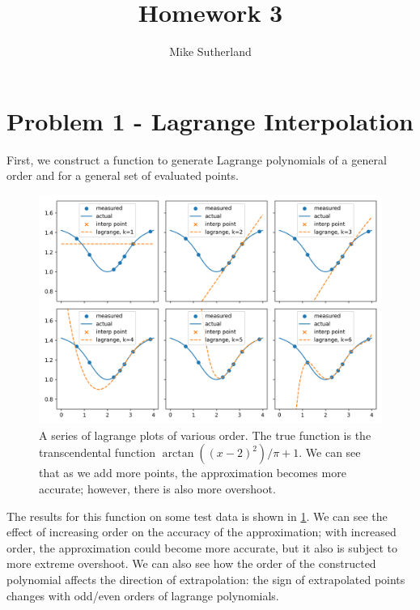 \documentclass[10pt,letterpaper]{article}
\author{Mike Sutherland}y
\title{Homework 3}
\begin{document}
    \maketitle
    
    \section{Problem 1 - Lagrange Interpolation}
    First, we construct a function to generate Lagrange polynomials of a general order and for a general set of evaluated points.
    \begin{figure}[h]
        \centering
        \includegraphics[width=1.0\linewidth]{../plots/lagrange.png}
        \caption{A series of lagrange plots of various order. The true function is the transcendental function $\arctan((x-2)^2)/\pi + 1$. We can see that as we add more points, the approximation becomes more accurate; however, there is also more overshoot.}
        \label{fig:lagrange}
    \end{figure}
    The results for this function on some test data is shown in \cref{fig:lagrange}. We can see the effect of increasing order on the accuracy of the approximation; with increased order, the approximation could become more accurate, but it also is subject to more extreme overshoot. We can also see how the order of the constructed polynomial affects the direction of extrapolation: the sign of extrapolated points changes with odd/even orders of lagrange polynomials.
\end{document}
